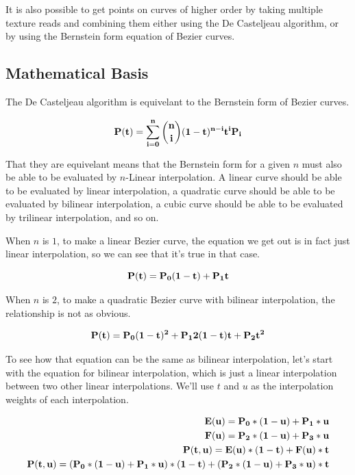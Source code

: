 \documentclass{jcgt}
\begin{document}
It is also possible to get points on curves of higher order by taking multiple texture reads and combining them either using the De Casteljeau algorithm, or by using the Bernstein form equation of Bezier curves.

\subsection{Mathematical Basis}

The De Casteljeau algorithm is equivelant to the Bernstein form of Bezier curves.

\begin{equation}
\bf{P(t)} = \sum\limits_{i=0}^n\binom {n} {i}(1-t)^{n-i}t^i\text{\bf{P}}_i
\label{eqn:bernsteinform}
\end{equation}

That they are equivelant means that the Bernstein form for a given $n$ must also be able to be evaluated by $n$-Linear interpolation.  A linear curve should be able to be evaluated by linear interpolation, a quadratic curve should be able to be evaluated by bilinear interpolation, a cubic curve should be able to be evaluated by trilinear interpolation, and so on.

When $n$ is $1$, to make a linear Bezier curve, the equation we get out is in fact just linear interpolation, so we can see that it's true in that case.

\begin{equation}
\bf{P(t)} = P_0(1-t) + P_1t
\label{eqn:bernsteinformn1}
\end{equation}

When $n$ is $2$, to make a quadratic Bezier curve with bilinear interpolation, the relationship is not as obvious.

\begin{equation}
\bf{P(t)} = P_0(1-t)^2 + P_12(1-t)t + P_2t^2
\label{eqn:bernsteinformn2}
\end{equation}

To see how that equation can be the same as bilinear interpolation, let's start with the equation for bilinear interpolation, which is just a linear interpolation between two other linear interpolations.  We'll use $t$ and $u$ as the interpolation weights of each interpolation.

\begin{equation}
\begin{split}
\bf{E(u)} = P_0*(1-u) + P_1*u \\
\bf{F(u)} = P_2*(1-u) + P_3*u \\
\bf{P(t,u)} = E(u)*(1-t) + F(u)*t \\
\bf{P(t,u)} = (P_0*(1-u) + P_1*u)*(1-t) + (P_2*(1-u) + P_3*u)*t
\end{split}
\label{eqn:bilinearinterpolation}
\end{equation}
\end{document}
